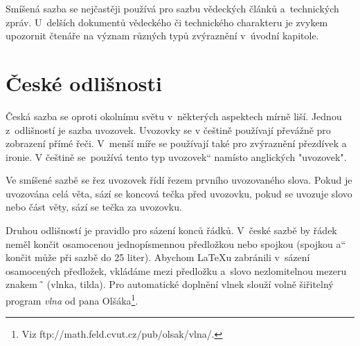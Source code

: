 \documentclass[11pt,a4paper,twocolumn]{article}
\providecommand{\myuv}[1]{\quotedblbase #1\textquotedblleft}
\begin{document}
\indent Smíšená sazba se nejčastěji používá pro sazbu vědeckých článků a~technických zpráv. U~delších dokumentů vědeckého či technického charakteru je zvykem upozornit čtenáře na význam různých typů zvýraznění v~úvodní kapitole. 

\section{České odlišnosti}

\noindent Česká sazba se oproti okolnímu světu v~některých aspektech mírně liší. Jednou z~odlišností je sazba uvo\-zo\-vek. Uvozovky se v češtině používají převážně pro zob\-ra\-ze\-ní přímé řeči. V~menší míře se používají také pro zvýraznění přezdívek a ironie. V češtině se~použí\-vá tento \myuv{typ uvozovek} namísto anglických "uvozovek". 

\indent Ve smíšené sazbě se řez uvozovek řídí řezem prv\-ní\-ho uvozovaného slova. Pokud je uvozována celá věta, sází se koncová tečka před uvozovku, pokud se uvozuje slovo nebo část věty, sází se tečka za uvozovku. 

\indent Druhou odlišností je pravidlo pro sázení konců řádků. V~české sazbě by řádek neměl končit osamocenou jednopísmennou předložkou nebo spojkou (spojkou \myuv{a} končit může při sazbě do 25 liter). Abychom \LaTeX u zabránili v~sázení osamocených předložek, vkládáme mezi předložku a~slovo nezlomitelnou mezeru znakem \,\~\, (vlnka, tilda). Pro automatické do\-plnění vlnek slouží volně šiřitelný program \textit{vlna} od pana Olšáka\footnote{Viz ftp://math.feld.cvut.cz/pub/olsak/vlna/.}.
\end{document}
